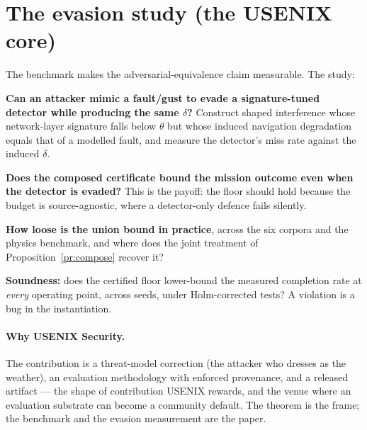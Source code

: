 \documentclass[11pt,a4paper]{article}
\begin{document}
\section{The evasion study (the USENIX core)}
The benchmark makes the adversarial-equivalence claim measurable. The study:

\begin{description}[leftmargin=2.6em,style=nextline]
\item[RQ1] \textbf{Can an attacker mimic a fault/gust to evade a
  signature-tuned detector while producing the same $\delta$?} Construct shaped
  interference whose network-layer signature falls below $\theta$ but whose
  induced navigation degradation equals that of a modelled fault, and measure the
  detector's miss rate against the induced $\delta$.
\item[RQ2] \textbf{Does the composed certificate bound the mission outcome even
  when the detector is evaded?} This is the payoff: the floor should hold because
  the budget is source-agnostic, where a detector-only defence fails silently.
\item[RQ3] \textbf{How loose is the union bound in practice}, across the six
  corpora and the physics benchmark, and where does the joint treatment of
  Proposition~\ref{pr:compose} recover it?
\item[RQ4] \textbf{Soundness:} does the certified floor lower-bound the measured
  completion rate at \emph{every} operating point, across seeds, under
  Holm-corrected tests? A violation is a bug in the instantiation.
\end{description}

\paragraph{Why USENIX Security.} The contribution is a threat-model correction
(the attacker who dresses as the weather), an evaluation methodology with enforced
provenance, and a released artifact --- the shape of contribution USENIX rewards,
and the venue where an evaluation substrate can become a community default. The
theorem is the frame; the benchmark and the evasion measurement are the paper.

\end{document}
